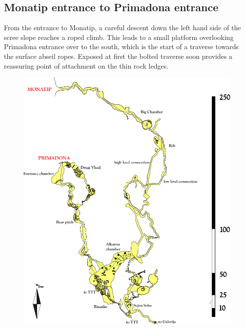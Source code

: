 \subsection{Monatip entrance to Primadona entrance}
From the entrance to Monatip, a careful descent down the left hand side of the scree slope reaches a roped climb. This leads to a small platform overlooking Primadona entrance over to the south, which is the start of a traverse towards the surface abseil ropes. Exposed at first  the bolted traverse soon provides a reassuring point of attachment on the thin rock ledges.


\begin{figure}[t!]
\centering
\includegraphics[height=\textheight]{Prima-Mona-trip.pdf}
\label{prima mona trip}
\end{figure}

